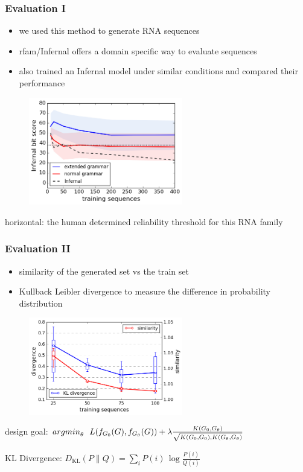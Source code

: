 \documentclass{beamer}
\begin{document}
\begin{frame}
    \frametitle{Evaluation I}
    \begin{itemize}
        \item we used this method to generate RNA sequences
        \item rfam/Infernal offers a domain specific  way to evaluate sequences
        \item also trained an Infernal model under similar conditions 
            and compared their performance
    \end{itemize}

   \begin{figure}[ht]
        \centering
        \includegraphics[width=0.60\textwidth]{images/infernal_abstr.png}
    \end{figure}
   \small{horizontal:  the human determined reliability threshold for this RNA family}
\end{frame}

\begin{frame}
    \frametitle{Evaluation II}
    
    \begin{itemize}
        \item similarity of the generated set vs the train set
        \item Kullback Leibler divergence to measure the difference in probability distribution
    \end{itemize}
   \begin{figure}[ht]
        \centering
        \includegraphics[width=0.6\textwidth]{images/learningcurve.png}
    \end{figure}
     design goal: {${argmin}_{\theta}~~L(f_{G_0}(G),f_{G_{\theta}}(G))+
    \lambda{{K(G_0,G_{\theta})}\over{\sqrt{K(G_0,G_0),K(G_{\theta},G_{\theta})}}} $}

    \tiny{KL Divergence:  $D_{\mathrm{KL}}(P\|Q) = \sum_i P(i) \, \log\frac{P(i)}{Q(i)}$ }
\end{frame}
\end{document}

